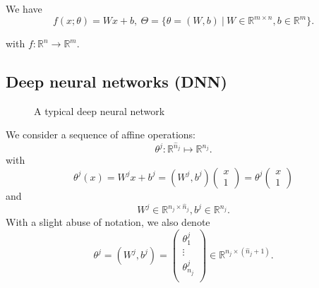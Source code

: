 We have
\begin{equation}
f(x; \theta )= W x+b, ~ \Theta = \{ \theta = (W,b) ~|~ W \in \mathbb{R}^{m \times n}, b \in \mathbb{R}^m \}.
\end{equation}

with $f: \mathbb{R}^n \to \mathbb{R}^m$.

\subsection{Deep neural networks (DNN)}
\begin{figure}[!ht]
\caption{A typical deep neural network}
\end{figure}
We consider a sequence of affine operations:
\begin{equation}
\theta^j: \mathbb R^{\hat{n}_{j}}\mapsto \mathbb R^{ n_{j}}.
\end{equation}
with
\begin{equation}\label{DNN_affinemap}
\theta^j(x) =  W^j x + b^j
=
(W^j, b^j)
\begin{pmatrix}
  x \\
1
\end{pmatrix}
=
\theta^j
\begin{pmatrix}
  x \\
1
\end{pmatrix}
\end{equation}
and
\begin{equation}
W^j\in \mathbb R^{n_j \times  \hat n_{j}}, b^j\in \mathbb R^{n_j}.
\end{equation}
With a slight abuse of notation, we also denote
\begin{equation}
\theta^j=(W^j, b^j)
=
\begin{pmatrix}
\theta^j_{1}\\
\vdots \\
\theta^j_{n_j}\\
\end{pmatrix}
\in \mathbb R^{n_j\times (\hat n_{j}+1)}.
\end{equation}

